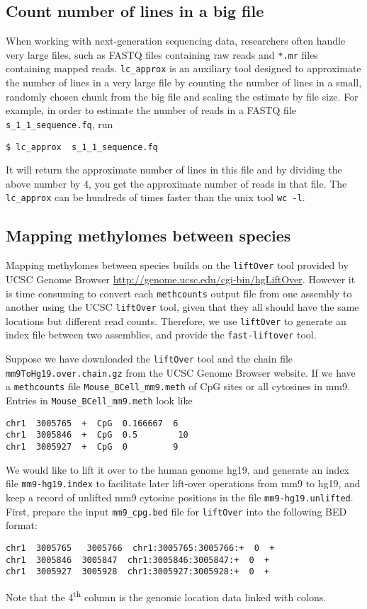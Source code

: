\documentclass[10pt]{article}
\newcommand{\prog}[1]{\texttt{#1}}
\newcommand{\fn}[1]{\texttt{#1}}
\begin{document}
{{\subsection{Count number of lines in a big file}
\label{sec:count-number-lines}

When working with next-generation sequencing data, researchers often
handle very large files, such as FASTQ files containing raw reads
and \fn{*.mr} files containing mapped reads. \prog{lc\_approx} is
an auxiliary tool designed to approximate the number of lines in a
very large file by counting the number of lines in a small, randomly
chosen chunk from the big file and scaling the estimate by file size.
For example, in order to estimate the number of reads in a FASTQ file
\fn{s\_1\_1\_sequence.fq}, run
\begin{verbatim}
$ lc_approx  s_1_1_sequence.fq
\end{verbatim}
It will return the approximate number of lines in this file and by
dividing the above number by 4, you get the approximate number of
reads in that file. The \prog{lc\_approx} can be hundreds of times
faster than the unix tool \prog{wc -l}.


\subsection{Mapping methylomes between species}
\label{sec:mapp-methyl-betw}
Mapping methylomes between species builds on the \prog{liftOver} tool
provided by UCSC Genome Browser
\url{http://genome.ucsc.edu/cgi-bin/hgLiftOver}. However it is time
consuming to convert each \prog{methcounts} output file from one
assembly to another using the UCSC \prog{liftOver} tool, given that
they all should have the same locations but different read counts.
Therefore, we use \prog{liftOver} to generate an index file between
two assemblies, and provide the \prog{fast-liftover} tool.

Suppose we have downloaded the \prog{liftOver} tool and the chain file
\fn{mm9ToHg19.over.chain.gz} from the UCSC Genome Browser website.  If
we have a \prog{methcounts} file \fn{Mouse\_BCell\_mm9.meth}
of CpG sites or all cytosines in mm9. Entries in
\fn{Mouse\_BCell\_mm9.meth} look like
\begin{verbatim}
chr1  3005765  +  CpG  0.166667  6
chr1  3005846  +  CpG  0.5        10
chr1  3005927  +  CpG  0         9
\end{verbatim}

We would like to lift it over to the human genome hg19, and generate
an index file \fn{mm9-hg19.index} to facilitate later lift-over
operations from mm9 to hg19, and keep a record of unlifted mm9
cytosine positions in the file \fn{mm9-hg19.unlifted}.
First, prepare the input \fn{mm9\_cpg.bed} file for \prog{liftOver} into
the following BED format:
\begin{verbatim}
chr1  3005765   3005766  chr1:3005765:3005766:+  0  +
chr1  3005846  3005847  chr1:3005846:3005847:+  0  +
chr1  3005927  3005928  chr1:3005927:3005928:+  0  +
\end{verbatim}
Note that the 4\textsuperscript{th} column is the genomic location data linked
with colons.

}}
\end{document}
